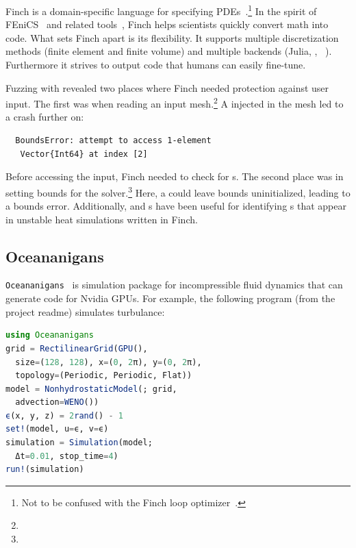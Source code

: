 \documentclass{juliacon}
\begin{document}
Finch is a domain-specific language for specifying
PDEs~\cite{heislerFinchDomainSpecific2022}.\footnote{Not to be confused
with the Finch loop optimizer~\cite{adka-cgo-2023}.}
In the spirit of FEniCS~\cite{fenics} and related
tools~\cite{freefem,openfoam,dune,firedrake},
Finch helps scientists quickly convert math into code.
What sets Finch apart is its flexibility.
It supports multiple discretization methods (finite element and finite
volume) and multiple backends (Julia, \CPP{}, \Dendro{}~\cite{dendro}).
Furthermore it strives to output code that humans can easily fine-tune.

Fuzzing with \FT{} revealed two places where Finch needed
protection against user input.
The first was when reading an input mesh.\footnote{}
A \NaN{} injected in the mesh led to a crash further on:

\begin{lstlisting}
  BoundsError: attempt to access 1-element
   Vector{Int64} at index [2]
\end{lstlisting}

Before accessing the input, Finch needed to check for \NaN{}s.
The second place was in setting bounds for the
solver.\footnote{}
Here, a \NaN{} could leave bounds uninitialized, leading to a bounds error.
Additionally, \FT{} and \CSTG{}s have been useful for identifying \NaN{}s that
appear in unstable heat simulations written in Finch.

\subsection{Oceananigans}
\label{s:ocean}

\texttt{Oceananigans}~\cite{OceananigansJOSS} is simulation package for incompressible
fluid dynamics that can generate code for Nvidia GPUs.
For example, the following program (from the project readme) simulates turbulance:

\begin{lstlisting}[language = Julia]
using Oceananigans
grid = RectilinearGrid(GPU(),
  size=(128, 128), x=(0, 2π), y=(0, 2π),
  topology=(Periodic, Periodic, Flat))
model = NonhydrostaticModel(; grid,
  advection=WENO())
ϵ(x, y, z) = 2rand() - 1
set!(model, u=ϵ, v=ϵ)
simulation = Simulation(model;
  Δt=0.01, stop_time=4)
run!(simulation)
\end{lstlisting}
\end{document}
